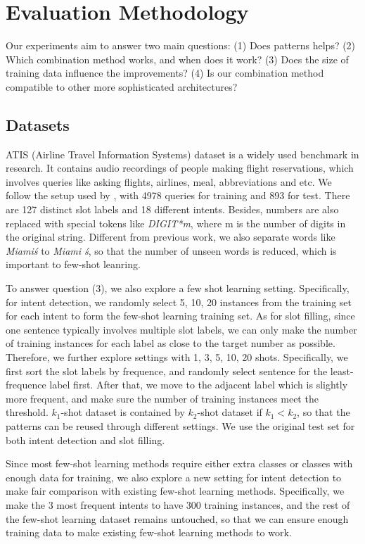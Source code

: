 \section{Evaluation Methodology}
Our experiments aim to answer two main questions: (1) Does \RE patterns helps? (2) Which combination method works, and when does it work? (3) Does the size of training data influence the improvements? (4) Is our combination method compatible to other more sophisticated \NN architectures?  

\subsection{Datasets}
ATIS (Airline Travel Information Systems) dataset \cite{hemphill1990atis} is a widely used benchmark in \NLU research. It contains audio recordings of people making flight reservations, which involves queries like asking flights, airlines, meal, abbreviations and etc. We follow the setup used by \cite{liu2016attention}, with 4978 queries for training and 893 for test. There are 127 distinct slot labels and 18 different intents. Besides, numbers are also replaced with special tokens like \emph{DIGIT*m}, where m is the number of digits in the original string. Different from previous work, we also separate words like \emph{Miami\'s} to \emph{Miami \'s}, so that the number of unseen words is reduced, which is important to few-shot leanring.

To answer question (3), we also explore a few shot learning setting. Specifically, for intent detection, we randomly select 5, 10, 20 instances from the training set for each intent to form the few-shot learning training set. As for slot filling, since one sentence typically involves multiple slot labels, we can only make the number of training instances for each label as close to the target number as possible. Therefore, we further explore settings with 1, 3, 5, 10, 20 shots. Specifically, we first sort the slot labels by frequence, and randomly select sentence for the least-frequence label first. After that, we move to the adjacent label which is slightly more frequent, and make sure the number of training instances meet the threshold. $k_1$-shot dataset is contained by $k_2$-shot dataset if $k_1 < k_2$, so that the \RE patterns can be reused through different settings. We use the original test set for both intent detection and slot filling.

Since most few-shot learning methods require either extra classes or classes with enough data for training, we also explore a new setting for intent detection to make fair comparison with existing few-shot learning methods. Specifically, we make the 3 most frequent intents to have 300 training instances, and the rest of the few-shot learning dataset remains untouched, so that we can ensure enough training data to make existing few-shot learning methods to work.


